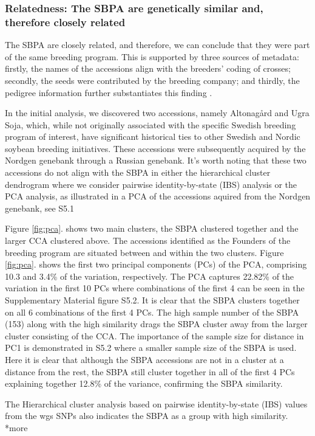 \documentclass[9pt, twocolumn,twoside]{gsajnl}
\begin{document}
\subsubsection{Relatedness: The SBPA are genetically similar and, therefore closely related}
The SBPA are closely related, and therefore, we can conclude that they were part of the same breeding program. This is supported by three sources of metadata: firstly, the names of the accessions align with the breeders' coding of crosses; secondly, the seeds were contributed by the breeding company; and thirdly, the pedigree information further substantiates this finding \cite{holmberg1973}.


In the initial analysis, we discovered two accessions, namely Altonagård and Ugra Soja, which, while not originally associated with the specific Swedish breeding program of interest, have significant historical ties to other Swedish and Nordic soybean breeding initiatives. These accessions were subsequently acquired by the Nordgen genebank through a Russian genebank. It's worth noting that these two accessions do not align with the SBPA in either the hierarchical cluster dendrogram where we consider pairwise identity-by-state (IBS) analysis or the PCA analysis, as illustrated in a PCA of the accessions aquired from the Nordgen genebank, see  S5.1


Figure \ref{fig:pca}. shows two main clusters, the SBPA clustered together and the larger CCA clustered above. The accessions identified as the Founders of the breeding program are situated between and within the two clusters. Figure \ref{fig:pca}.  shows the first two principal components (PCs) of the PCA, comprising 10.3 and 3.4\% of the variation, respectively. The PCA captures 22.82\% of the variation in the first 10 PCs where combinations of the first 4 can be seen in the Supplementary Material figure S5.2. It is clear that the SBPA clusters together on all 6 combinations of the first 4 PCs. 
The high sample number of the SBPA (153) along with the high similarity drags the SBPA cluster away from the larger cluster consisting of the CCA. The importance of the sample size for distance in PC1 is demonstrated in S5.2 where a smaller sample size of the SBPA is used. Here it is clear that although the SBPA accessions are not in a cluster at a distance from the rest, the SBPA still cluster together in all of the first 4 PCs explaining together 12.8\% of the variance, confirming the SBPA similarity.  

The Hierarchical cluster analysis based on pairwise identity-by-state (IBS) values from the wgs SNPs also indicates the SBPA as a group with high similarity.  *more
\end{document}
